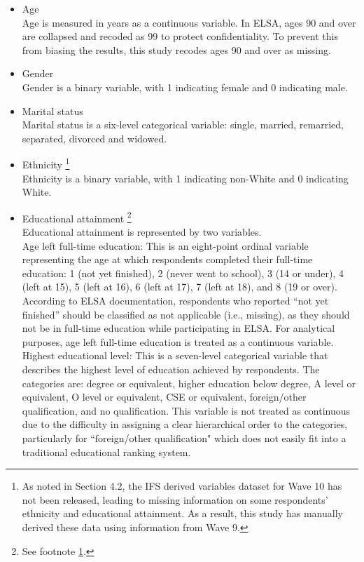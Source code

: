 \begin{itemize}[wide=0pt, leftmargin=*, labelwidth=0pt, labelindent=\parindent, itemindent=0pt]
    \item Age \\
    Age is measured in years as a continuous variable. In ELSA, ages 90 and over are collapsed and recoded as 99 to protect confidentiality. To prevent this from biasing the results, this study recodes ages 90 and over as missing.
    \item Gender \\
    Gender is a binary variable, with 1 indicating female and 0 indicating male.
    \item Marital status \\
    Marital status is a six-level categorical variable: single, married, remarried, separated, divorced and widowed.
    \item Ethnicity \footnote{\label{fn:ifs}As noted in Section 4.2, the IFS derived variables dataset for Wave 10 has not been released, leading to missing information on some respondents' ethnicity and educational attainment. As a result, this study has manually derived these data using information from Wave 9.} \\
    Ethnicity is a binary variable, with 1 indicating non-White and 0 indicating White.
    \item Educational attainment \footnote{See footnote \ref{fn:ifs}.} \\
    Educational attainment is represented by two variables. \\
    Age left full-time education: This is an eight-point ordinal variable representing the age at which respondents completed their full-time education: 1 (not yet finished), 2 (never went to school), 3 (14 or under), 4 (left at 15), 5 (left at 16), 6 (left at 17), 7 (left at 18), and 8 (19 or over). According to ELSA documentation, respondents who reported ``not yet finished” should be classified as not applicable (i.e., missing), as they should not be in full-time education while participating in ELSA. For analytical purposes, age left full-time education is treated as a continuous variable. \\
    Highest educational level: This is a seven-level categorical variable that describes the highest level of education achieved by respondents. The categories are: degree or equivalent, higher education below degree, A level or equivalent, O level or equivalent, CSE or equivalent, foreign/other qualification, and no qualification. This variable is not treated as continuous due to the difficulty in assigning a clear hierarchical order to the categories, particularly for ``foreign/other qualification" which does not easily fit into a traditional educational ranking system.

\end{itemize}
